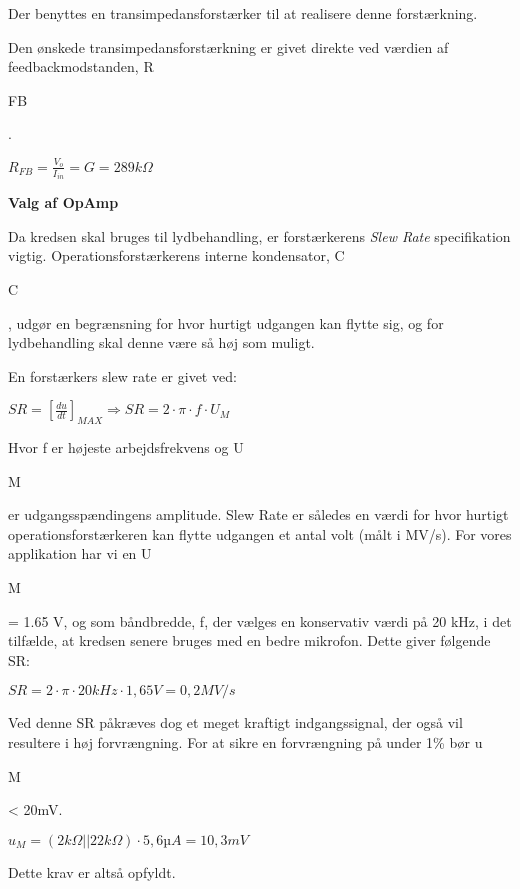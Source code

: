 Der benyttes en transimpedansforstærker til at realisere denne forstærkning. 

Den ønskede transimpedansforstærkning er givet direkte ved værdien af feedbackmodstanden, R\begin{tiny}FB\end{tiny}.
\begin{center}
${ R }_{ FB }=\frac { { V }_{ o } }{ { I }_{ in } } =G=289k\Omega$
\end{center}

\textbf{Valg af OpAmp}

Da kredsen skal bruges til lydbehandling, er forstærkerens \textit{Slew Rate} specifikation vigtig.
Operationsforstærkerens interne kondensator, C\begin{tiny}C\end{tiny}, udgør en begrænsning for hvor hurtigt udgangen kan flytte sig, og for lydbehandling skal denne være så høj som muligt.

En forstærkers slew rate er givet ved:
\begin{center}
$SR={ \left[ \frac { du }{ dt }  \right]  }_{ MAX }\Rightarrow SR=2\cdot \pi \cdot f\cdot { U }_{ M }$
\end{center}
Hvor f er højeste arbejdsfrekvens og U\begin{tiny}M\end{tiny} er udgangsspændingens amplitude. Slew Rate er således en værdi for hvor hurtigt operationsforstærkeren kan flytte udgangen et antal volt (målt i MV/s).
For vores applikation har vi en U\begin{tiny}M\end{tiny} = 1.65 V, og som båndbredde, f, der vælges en konservativ værdi på 20 kHz, i det tilfælde, at kredsen senere bruges med en bedre mikrofon. Dette giver følgende SR:
\begin{center}
$SR=2\cdot \pi \cdot 20kHz\cdot 1,65V=0,2MV/s$
\end{center}

Ved denne SR påkræves dog et meget kraftigt indgangssignal, der også vil resultere i høj forvrængning. For at sikre en forvrængning på under 1\% bør u\begin{tiny}M\end{tiny} < 20mV.
\begin{center}
${ u }_{ M }=(2k\Omega ||22k\Omega )\cdot { 5,6µA=10,3mV }$
\end{center}
Dette krav er altså opfyldt.

